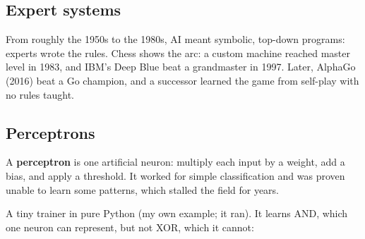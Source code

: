 \subsection{Expert systems}

From roughly the 1950s to the 1980s, AI meant symbolic, top-down programs: experts wrote the
rules. Chess shows the arc: a custom machine reached master level in 1983, and IBM's Deep Blue beat
a grandmaster in 1997. Later, AlphaGo (2016) beat a Go champion, and a successor learned the game
from self-play with no rules taught.

\subsection{Perceptrons}

A \textbf{perceptron} is one artificial neuron: multiply each input by a weight, add a bias, and
apply a threshold. It worked for simple classification and was proven unable to learn some
patterns, which stalled the field for years.

\begin{center}
\end{center}

A tiny trainer in pure Python (my own example; it ran). It learns AND, which one neuron can
represent, but not XOR, which it cannot:

